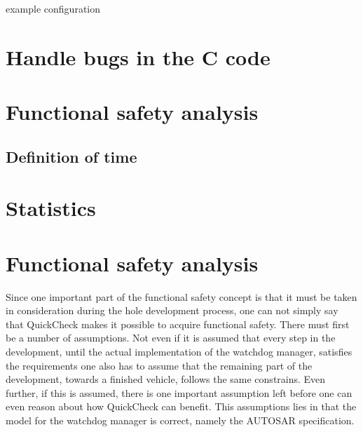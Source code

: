 \begin{table}[!h]
\label{TABLE:STATUSES_EXAMPLE}

\caption{example configuration}
\end{table}

\section{Handle bugs in the C code}
\label{sec:handlebugs}

\section{Functional safety analysis}
\subsection{Definition of time}
\label{SEC:FUNCTIONAL_SAFETY_TIME}

\section{Statistics}

\section{Functional safety analysis}
Since one important part of the functional safety concept is that it must be
taken in consideration during the hole development process, one can not simply
say that QuickCheck makes it possible to acquire functional safety. There must
first be a number of assumptions. Not even if it is assumed that
every step in the development, until the actual implementation of the watchdog
manager, satisfies the requirements one also has to assume that the remaining
part of the development, towards a finished vehicle, follows the same
constrains. Even further, if this is assumed, there is one important
assumption left before
one can even reason about how QuickCheck can benefit. 
This assumptions lies in that the model for the watchdog
manager is correct, namely the AUTOSAR specification. 



